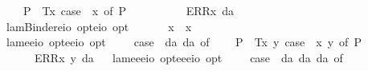 \begin{isabellebody}
\ \ \ \ P{\isacharparenleft}{\isacharunderscore}{\isacharparenright}\ {\isasymRightarrow}\ T{\isacharparenleft}{\isasymlambda}x{\isachardot}\ case\ {\isacharparenleft}{\isasymPhi}\ x{\isacharparenright}\ of\ P{\isacharparenleft}{\isasymphi}{\isacharparenright}\ {\isasymRightarrow}\ {\isasymphi}{\isacharparenright}\ {\isacharbar}\ \isanewline
\ \ \ \ {\isacharunderscore}\ {\isasymRightarrow}\ ERR{\isacharparenleft}{\isasymlambda}x{\isachardot}\ da{\isacharparenright}{\isachardoublequoteclose}\isanewline
\ \isamarkupfalse%
\ lamBinder{\isacharcolon}{\isacharcolon}{\isachardoublequoteopen}{\isacharparenleft}e{\isasymRightarrow}io\ opt{\isacharparenright}{\isasymRightarrow}{\isacharparenleft}e{\isasymRightarrow}io{\isacharparenright}\ opt{\isachardoublequoteclose}\ {\isacharparenleft}\ {\isachardoublequoteopen}\isactrlbold {\isasymlambda}{\isachardoublequoteclose}\ {\isacharbrackleft}{}{\isacharbrackright}\ {}{\isacharparenright}\ \ \ {\isachardoublequoteopen}\isactrlbold {\isasymlambda}x{\isachardot}\ {\isasymphi}\ x\ {\isasymequiv}\ \isactrlbold {\isasymlambda}\ {\isasymphi}{\isachardoublequoteclose}\isanewline
\ \isamarkupfalse%
\ lam{}{\isacharcolon}{\isacharcolon}{\isachardoublequoteopen}{\isacharparenleft}e{\isasymRightarrow}e{\isasymRightarrow}io\ opt{\isacharparenright}{\isasymRightarrow}{\isacharparenleft}e{\isasymRightarrow}e{\isasymRightarrow}io{\isacharparenright}\ opt{\isachardoublequoteclose}\ {\isacharparenleft}{\isachardoublequoteopen}\isactrlbold {\isasymlambda}\ \ {\isachardoublequoteopen}\isactrlbold {\isasymlambda}\ {\isasymequiv}\ case\ {\isacharparenleft}{\isasymPhi}\ da\ da{\isacharparenright}\ of\isanewline
\ \ \ \ P{\isacharparenleft}{\isacharunderscore}{\isacharparenright}\ {\isasymRightarrow}\ T{\isacharparenleft}{\isasymlambda}x\ y{\isachardot}\ case\ {\isacharparenleft}{\isasymPhi}\ x\ y{\isacharparenright}\ of\ P{\isacharparenleft}{\isasymphi}{\isacharparenright}\ {\isasymRightarrow}\ {\isasymphi}{\isacharparenright}\ {\isacharbar}\ \isanewline
\ \ \ \ {\isacharunderscore}\ {\isasymRightarrow}\ ERR{\isacharparenleft}{\isasymlambda}x\ y{\isachardot}\ da{\isacharparenright}{\isachardoublequoteclose}\isanewline
\ \isamarkupfalse%
\ lam{}{\isacharcolon}{\isacharcolon}{\isachardoublequoteopen}{\isacharparenleft}e{\isasymRightarrow}e{\isasymRightarrow}e{\isasymRightarrow}io\ opt{\isacharparenright}{\isasymRightarrow}{\isacharparenleft}e{\isasymRightarrow}e{\isasymRightarrow}e{\isasymRightarrow}io{\isacharparenright}\ opt{\isachardoublequoteclose}\ {\isacharparenleft}{\isachardoublequoteopen}\isactrlbold {\isasymlambda}\ \ {\isachardoublequoteopen}\isactrlbold {\isasymlambda}\ {\isasymequiv}\ case\ {\isacharparenleft}{\isasymPhi}\ da\ da\ da{\isacharparenright}\ of\isanewline

\end{isabellebody}
